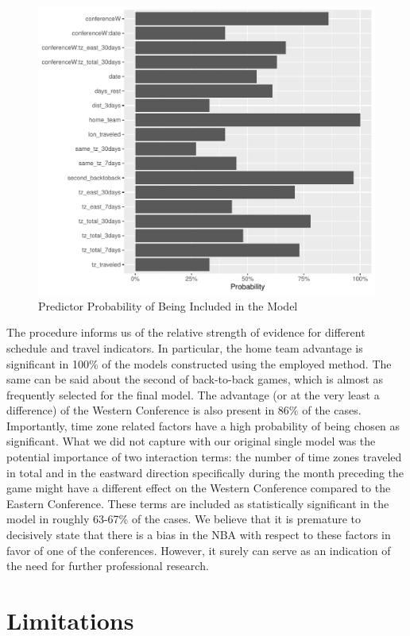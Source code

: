 \documentclass[
    12pt,
    a4paper,
    titlepage,  %
    abstract,  %
    headings=standardclasses,  %
    bibliography=totocnumbered  %
]{scrartcl}
\begin{document}
\begin{figure}[ht]
    \centering
    \includegraphics[width=0.9\linewidth]{bootstrap}
    \caption{Predictor Probability of Being Included in the Model}
    \label{fig:bootstrap}
\end{figure}

The procedure informs us of the relative strength of evidence for different schedule and travel indicators. In particular, the home team advantage is significant in 100\% of the models constructed using the employed method. The same can be said about the second of back-to-back games, which is almost as frequently selected for the final model. The advantage (or at the very least a difference) of the Western Conference is also present in 86\% of the cases. Importantly, time zone related factors have a high probability of being chosen as significant. What we did not capture with our original single model was the potential importance of two interaction terms: the number of time zones traveled in total and in the eastward direction specifically during the month preceding the game might have a different effect on the Western Conference compared to the Eastern Conference. These terms are included as statistically significant in the model in roughly 63-67\% of the cases. We believe that it is premature to decisively state that there is a bias in the NBA with respect to these factors in favor of one of the conferences. However, it surely can serve as an indication of the need for further professional research.

\section{Limitations}
\end{document}
